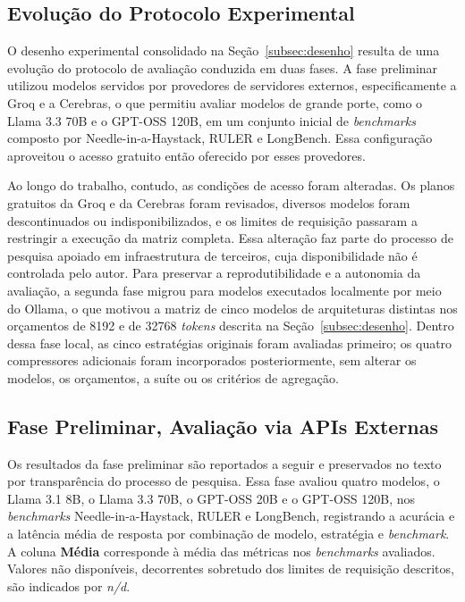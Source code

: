 \subsection{Evolução do Protocolo Experimental}
\label{subsec:evolucao-protocolo}

O desenho experimental consolidado na Seção~\ref{subsec:desenho} resulta de uma evolução do protocolo de avaliação conduzida em duas fases. A fase preliminar utilizou modelos servidos por provedores de servidores externos, especificamente a Groq e a Cerebras, o que permitiu avaliar modelos de grande porte, como o Llama 3.3 70B e o GPT-OSS 120B, em um conjunto inicial de \textit{benchmarks} composto por Needle-in-a-Haystack, RULER e LongBench. Essa configuração aproveitou o acesso gratuito então oferecido por esses provedores.

Ao longo do trabalho, contudo, as condições de acesso foram alteradas. Os planos gratuitos da Groq e da Cerebras foram revisados, diversos modelos foram descontinuados ou indisponibilizados, e os limites de requisição passaram a restringir a execução da matriz completa. Essa alteração faz parte do processo de pesquisa apoiado em infraestrutura de terceiros, cuja disponibilidade não é controlada pelo autor. Para preservar a reprodutibilidade e a autonomia da avaliação, a segunda fase migrou para modelos executados localmente por meio do Ollama, o que motivou a matriz de cinco modelos de arquiteturas distintas nos orçamentos de 8192 e de 32768 \textit{tokens} descrita na Seção~\ref{subsec:desenho}. Dentro dessa fase local, as cinco estratégias originais foram avaliadas primeiro; os quatro compressores adicionais foram incorporados posteriormente, sem alterar os modelos, os orçamentos, a suíte ou os critérios de agregação.

\subsection{Fase Preliminar, Avaliação via APIs Externas}
\label{subsec:fase-preliminar}

Os resultados da fase preliminar são reportados a seguir e preservados no texto por transparência do processo de pesquisa. Essa fase avaliou quatro modelos, o Llama 3.1 8B, o Llama 3.3 70B, o GPT-OSS 20B e o GPT-OSS 120B, nos \textit{benchmarks} Needle-in-a-Haystack, RULER e LongBench, registrando a acurácia e a latência média de resposta por combinação de modelo, estratégia e \textit{benchmark}. A coluna \textbf{Média} corresponde à média das métricas nos \textit{benchmarks} avaliados. Valores não disponíveis, decorrentes sobretudo dos limites de requisição descritos, são indicados por \textit{n/d}.

